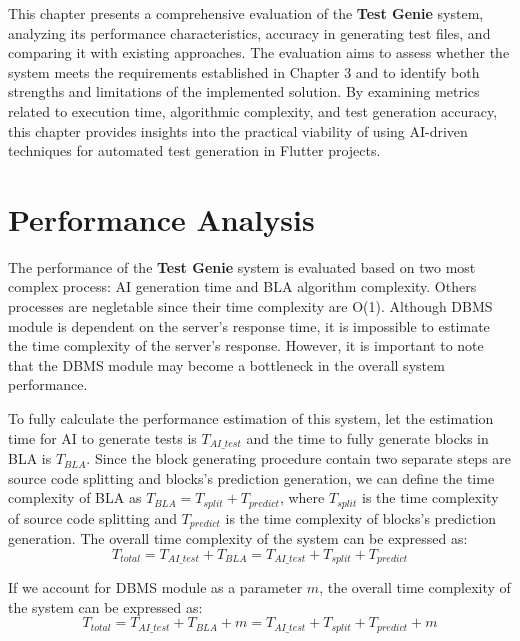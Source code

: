 This chapter presents a comprehensive evaluation of the \textbf{Test Genie} system, analyzing its performance characteristics, accuracy in generating test files, and comparing it with existing approaches. The evaluation aims to assess whether the system meets the requirements established in Chapter 3 and to identify both strengths and limitations of the implemented solution. By examining metrics related to execution time, algorithmic complexity, and test generation accuracy, this chapter provides insights into the practical viability of using AI-driven techniques for automated test generation in Flutter projects.

\section{Performance Analysis}

The performance of the \textbf{Test Genie} system is evaluated based on two most complex process: AI generation time and BLA algorithm complexity. Others processes are negletable since their time complexity are O(1). Although DBMS module is dependent on the server's response time, it is impossible to estimate the time complexity of the server's response. However, it is important to note that the DBMS module may become a bottleneck in the overall system performance.

To fully calculate the performance estimation of this system, let the estimation time for AI to generate tests is $T_{AI\_test}$ and the time to fully generate blocks in BLA is $T_{BLA}$. Since the block generating procedure contain two separate steps are source code splitting and blocks's prediction generation, we can define the time complexity of BLA as $T_{BLA} = T_{split} + T_{predict}$, where $T_{split}$ is the time complexity of source code splitting and $T_{predict}$ is the time complexity of blocks's prediction generation. The overall time complexity of the system can be expressed as:
\begin{equation}
T_{total} = T_{AI\_test} + T_{BLA} = T_{AI\_test} + T_{split} + T_{predict}
\end{equation}

If we account for DBMS module as a parameter $m$, the overall time complexity of the system can be expressed as:
\begin{equation}
T_{total} = T_{AI\_test} + T_{BLA} + m = T_{AI\_test} + T_{split} + T_{predict} + m
\end{equation}


